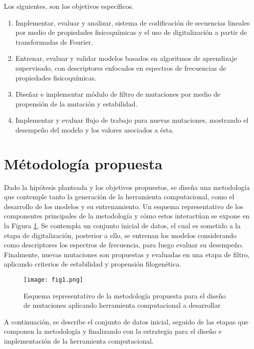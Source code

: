 Los siguientes, son los objetivos específicos.

\begin{enumerate}
	
	\item Implementar, evaluar y analizar, sistema de codificación de secuencias lineales por medio de propiedades fisicoquímicas y el uso de digitalización a partir de transformadas de Fourier.
	\item Entrenar, evaluar y validar modelos basados en algoritmos de aprendizaje supervisado, con descriptores enfocados en espectros de frecuencias de propiedades fisicoquímicas.
	\item Diseñar e implementar módulo de filtro de mutaciones por medio de propensión de la mutación y estabilidad.
	\item Implementar y evaluar flujo de trabajo para nuevas mutaciones, mostrando el desempeño del modelo y los valores asociados a ésta.
	
\end{enumerate}

\section{Métodología propuesta}

Dado la hipótesis planteada y los objetivos propuestos, se diseña una metodología que contemple tanto la generación de la herramienta computacional, como el desarrollo de los modelos y su entrenamiento. Un esquema representativo de los componentes principales de la metodología y cómo estos interactúan se expone en la Figura \ref{cap4:fig1}, Se contempla un conjunto inicial de datos, el cual es sometido a la etapa de digitalización, posterior a ello, se entrenan los modelos considerando como descriptores los espectros de frecuencia, para luego evaluar su desempeño. Finalmente, nuevas mutaciones son propuestas y evaluadas en una etapa de filtro, aplicando criterios de estabilidad y propensión filogenética.

\begin{figure}[!h]
	
	\centering
	\texttt{[image: fig1.png]}
	\caption{Esquema representativo de la metodología propuesta para el diseño de mutaciones aplicando herramienta computacional a desarrollar}
	\label{cap4:fig1}
\end{figure}

A continuación, se describe el conjunto de datos inicial, seguido de las etapas que componen la metodología y finalizando con la estrategia para el diseño e implementación de la herramienta computacional.

